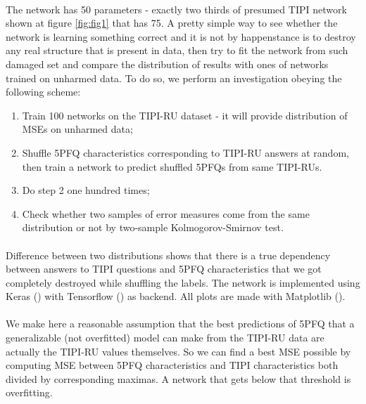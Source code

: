 \documentclass{llncs}
\begin{document}
\paragraph{}
The network has 50 parameters - exactly two thirds of presumed TIPI network shown at figure \ref{fig:fig1} that has 75. A pretty simple way to see whether the network is learning something correct and it is not by happenstance is to destroy any real structure that is present in data, then try to fit the network from such damaged set and compare the distribution of results with ones of networks trained on unharmed data. To do so, we perform an investigation obeying the following scheme:
\begin{enumerate}
	\item Train 100 networks on the TIPI-RU dataset - it will provide distribution of MSEs on unharmed data;
	\item Shuffle 5PFQ characteristics corresponding to TIPI-RU answers at random, then train a network to predict shuffled 5PFQs from same TIPI-RUs.
	\item Do step 2 one hundred times;
	\item Check whether two samples of error measures come from the same distribution or not by two-sample Kolmogorov-Smirnov test.
\end{enumerate}

\paragraph{}
Difference between two distributions shows that there is a true dependency between answers to TIPI questions and 5PFQ characteristics that we got completely destroyed while shuffling the labels. The network is implemented using Keras (\cite{chollet2015keras}) with Tensorflow (\cite{tensorflow2015-whitepaper}) as backend. All plots are made with Matplotlib (\cite{hunter2007matplotlib}). 

\paragraph{}
We make here a reasonable assumption that the best predictions of 5PFQ that a generalizable (not overfitted) model can make from the TIPI-RU data are actually the TIPI-RU values themselves. So we can find a best MSE possible by computing MSE between 5PFQ characteristics and TIPI characteristics both divided by corresponding maximas. A network that gets below that threshold is overfitting. 
\end{document}
